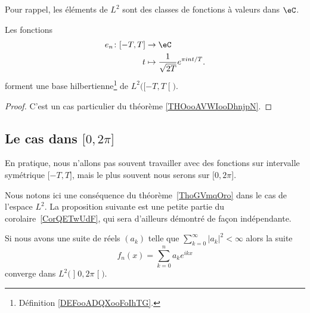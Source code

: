 Pour rappel, les éléments de \( L^2\) sont des classes de fonctions à valeurs dans \( \eC\).

\begin{proposition}     \label{PROPooHNJZooGfRCfU}
    Les fonctions    
    \begin{equation}
        \begin{aligned}
            e_n\colon \mathopen[ -T , T \mathclose]&\to \eC \\
            t&\mapsto \frac{1}{ \sqrt{ 2T } } e^{\pi int/T}. 
        \end{aligned}
    \end{equation}
    forment une base hilbertienne\footnote{Définition \ref{DEFooADQXooFoIhTG}.} de \( L^2\big( \mathopen[ -T , T \mathclose[ \big)\).
\end{proposition}

\begin{proof}
    C'est un cas particulier du théorème \ref{THOooAVWIooDhnjpN}.
\end{proof}

\subsection{Le cas dans \( \mathopen[ 0 , 2\pi \mathclose]\)}

En pratique, nous n'allons pas souvent travailler avec des fonctions sur intervalle symétrique \( \mathopen[ -T , T \mathclose]\), mais le plus souvent nous serons sur \( \mathopen[ 0 , 2\pi \mathclose]\).

Nous notons ici une conséquence du théorème~\ref{ThoGVmqOro} dans le cas de l'espace \( L^2\). La proposition suivante est une petite partie du corolaire~\ref{CorQETwUdF}, qui sera d'ailleurs démontré de façon indépendante.

\begin{proposition}
    Si nous avons une suite de réels \( (a_k)\) telle que \( \sum_{k=0}^{\infty}| a_k |^2<\infty\) alors la suite
    \begin{equation}
        f_n(x)=\sum_{k=0}^na_k e^{ikx}
    \end{equation}
    converge dans \( L^2\big( \mathopen] 0 , 2\pi \mathclose[ \big)\).
\end{proposition}


